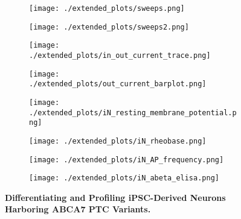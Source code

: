 \begin{figure}[H]
    \begin{subfigure}[t]{0.33\textwidth}
        \caption{}
        \texttt{[image: ./extended\_plots/sweeps.png]}        
    \end{subfigure}   
    \begin{subfigure}[t]{0.2\textwidth}
        \caption{}
        \texttt{[image: ./extended\_plots/sweeps2.png]}        
    \end{subfigure}   
    \begin{subfigure}[t]{0.33\textwidth}
        \caption{}
        \texttt{[image: ./extended\_plots/in\_out\_current\_trace.png]}        
    \end{subfigure}  
    \begin{subfigure}[t]{0.33\textwidth}
        \caption{}
        \texttt{[image: ./extended\_plots/out\_current\_barplot.png]}        
    \end{subfigure}  
    \begin{subfigure}[t]{0.25\textwidth}
        \caption{}
        \texttt{[image: ./extended\_plots/iN\_resting\_membrane\_potential.png]}        
    \end{subfigure}  
    \begin{subfigure}[t]{0.25\textwidth}
        \caption{}
        \texttt{[image: ./extended\_plots/iN\_rheobase.png]}        
    \end{subfigure} 
    \hspace{1cm}
    \begin{subfigure}[t]{0.3\textwidth}
        \caption{}
        \texttt{[image: ./extended\_plots/iN\_AP\_frequency.png]}        
    \end{subfigure}  
    \hspace{1cm}
    \begin{subfigure}[t]{0.35\textwidth}
        \caption{}
        \texttt{[image: ./extended\_plots/iN\_abeta\_elisa.png]}        
    \end{subfigure}  
    \caption{
        \textbf{Differentiating and Profiling iPSC-Derived Neurons Harboring ABCA7 PTC Variants.}\\
    }
    \label{fig:differentiating_iPSC_neurons}
\end{figure}
